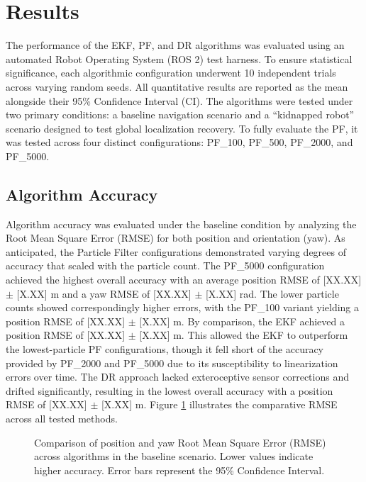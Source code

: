 \section{Results}\label{sec:Results}
The performance of the EKF, PF, and DR algorithms was evaluated using an automated Robot Operating System (ROS 2) test harness. 
To ensure statistical significance, each algorithmic configuration underwent 10 independent trials across varying random seeds. 
All quantitative results are reported as the mean alongside their 95\% Confidence Interval (CI).
The algorithms were tested under two primary conditions: a baseline navigation scenario and a ``kidnapped robot'' scenario designed to test global localization recovery. 
To fully evaluate the PF, it was tested across four distinct configurations: PF\_100, PF\_500, PF\_2000, and PF\_5000. 

\subsection{Algorithm Accuracy}
Algorithm accuracy was evaluated under the baseline condition by analyzing the Root Mean Square Error (RMSE) for both position and orientation (yaw). 
As anticipated, the Particle Filter configurations demonstrated varying degrees of accuracy that scaled with the particle count. 
The PF\_5000 configuration achieved the highest overall accuracy with an average position RMSE of [XX.XX] $\pm$ [X.XX] m and a yaw RMSE of [XX.XX] $\pm$ [X.XX] rad. 
The lower particle counts showed correspondingly higher errors, with the PF\_100 variant yielding a position RMSE of [XX.XX] $\pm$ [X.XX] m. 
By comparison, the EKF achieved a position RMSE of [XX.XX] $\pm$ [X.XX] m. 
This allowed the EKF to outperform the lowest-particle PF configurations, though it fell short of the accuracy provided by PF\_2000 and PF\_5000 due to its susceptibility to linearization errors over time. 
The DR approach lacked exteroceptive sensor corrections and drifted significantly, resulting in the lowest overall accuracy with a position RMSE of [XX.XX] $\pm$ [X.XX] m. 
Figure \ref{fig:accuracy_comparison} illustrates the comparative RMSE across all tested methods.

\begin{figure}[!htbp]
    \centering
    \caption{Comparison of position and yaw Root Mean Square Error (RMSE) across algorithms in the baseline scenario. 
    Lower values indicate higher accuracy. 
    Error bars represent the 95\% Confidence Interval.}
    \label{fig:accuracy_comparison}
\end{figure}

